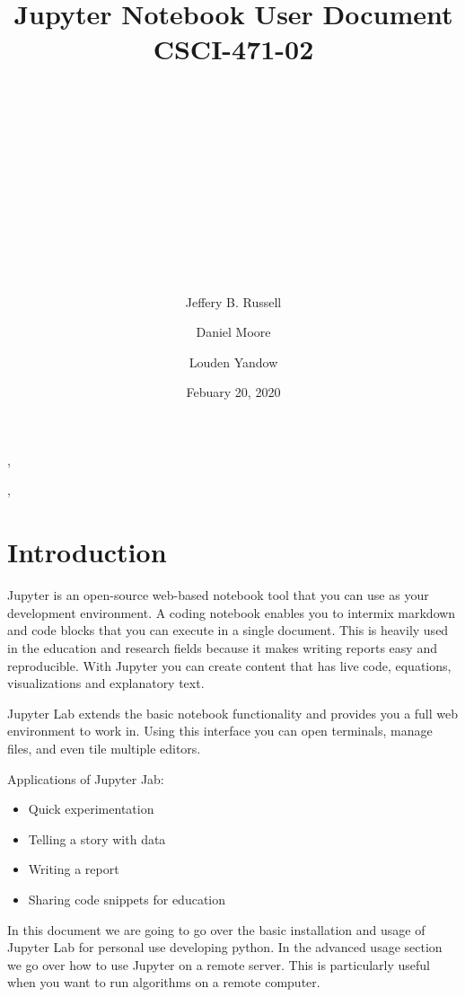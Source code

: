 \documentclass[pdftex,12pt]{artikel3}
\title{
\begin{center}
\huge{Jupyter Notebook User Document} \\
\huge{CSCI-471-02}\\
\end{center}
\\
\\
\\
\\
\\
\author{} %
\date{}   %
}
\begin{document}
\maketitle


\begin{center}
\author{Jeffery B. Russell},
\author{Daniel Moore},
\author{Louden Yandow}

\date{Febuary 20, 2020}
\end{center}

\newpage

\tableofcontents
{}
\newpage
\listoffigures
{}

\newpage

\section{Introduction}

Jupyter  is an open-source web-based notebook tool that you can use as your development environment.
A coding notebook enables you to intermix markdown and code blocks that you can execute in a single document. This is heavily used in the education and research fields because it makes writing reports easy and reproducible. With Jupyter you can create content that has live code, equations, visualizations and explanatory text.

Jupyter Lab extends the basic notebook functionality and provides you a full web environment to work in. Using this interface you can open terminals, manage files, and even tile multiple editors.

Applications of Jupyter Jab:

\begin{itemize}
  \item Quick experimentation
  \item Telling a story with data
  \item Writing a report
  \item Sharing code snippets for education
\end{itemize}

In this document we are going to go over the basic installation and usage of Jupyter Lab for personal use developing python. In the advanced usage section we go over how to use Jupyter on a remote server. This is particularly useful when you want to run algorithms on a remote computer.
\end{document}
